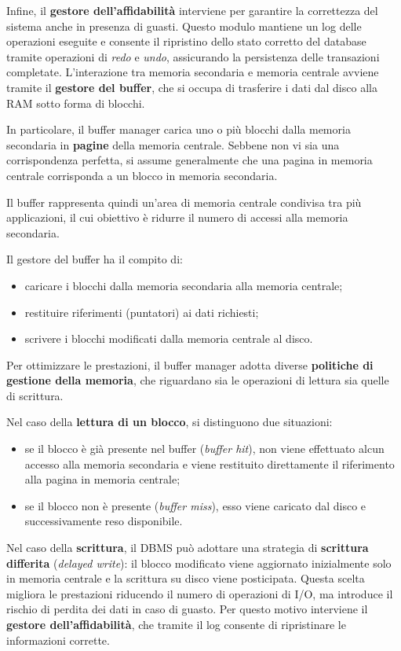 Infine, il \textbf{gestore dell'affidabilità} interviene per garantire la correttezza del sistema anche in presenza di guasti. 
Questo modulo mantiene un log delle operazioni eseguite e consente il ripristino dello stato corretto del database tramite operazioni di \textit{redo} e \textit{undo}, assicurando la persistenza delle transazioni completate.
L'interazione tra memoria secondaria e memoria centrale avviene tramite il \textbf{gestore del buffer}, che si occupa di trasferire i dati dal disco alla RAM sotto forma di blocchi.

In particolare, il buffer manager carica uno o più blocchi dalla memoria secondaria in \textbf{pagine} della memoria centrale. 
Sebbene non vi sia una corrispondenza perfetta, si assume generalmente che una pagina in memoria centrale corrisponda a un blocco in memoria secondaria.

Il buffer rappresenta quindi un'area di memoria centrale condivisa tra più applicazioni, il cui obiettivo è ridurre il numero di accessi alla memoria secondaria.

Il gestore del buffer ha il compito di:
\begin{itemize}
	\item caricare i blocchi dalla memoria secondaria alla memoria centrale;
	\item restituire riferimenti (puntatori) ai dati richiesti;
	\item scrivere i blocchi modificati dalla memoria centrale al disco.
\end{itemize}

Per ottimizzare le prestazioni, il buffer manager adotta diverse \textbf{politiche di gestione della memoria}, che riguardano sia le operazioni di lettura sia quelle di scrittura.

Nel caso della \textbf{lettura di un blocco}, si distinguono due situazioni:
\begin{itemize}
	\item se il blocco è già presente nel buffer (\textit{buffer hit}), non viene effettuato alcun accesso alla memoria secondaria e viene restituito direttamente il riferimento alla pagina in memoria centrale;
	\item se il blocco non è presente (\textit{buffer miss}), esso viene caricato dal disco e successivamente reso disponibile.
\end{itemize}

Nel caso della \textbf{scrittura}, il DBMS può adottare una strategia di \textbf{scrittura differita} (\textit{delayed write}): il blocco modificato viene aggiornato inizialmente solo in memoria centrale e la scrittura su disco viene posticipata. 
Questa scelta migliora le prestazioni riducendo il numero di operazioni di I/O, ma introduce il rischio di perdita dei dati in caso di guasto. 
Per questo motivo interviene il \textbf{gestore dell'affidabilità}, che tramite il log consente di ripristinare le informazioni corrette.

